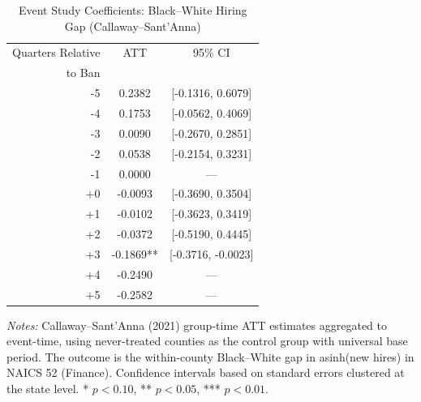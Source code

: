 \begin{table}[htbp]
\centering
\caption{Event Study Coefficients: Black--White Hiring Gap (Callaway--Sant'Anna)}
\label{tab:event_study}
\begin{tabular}{rcc}
\toprule
Quarters Relative & ATT & 95\% CI \\
to Ban & & \\
\midrule
-5 & 0.2382 & [-0.1316, 0.6079] \\
-4 & 0.1753 & [-0.0562, 0.4069] \\
-3 & 0.0090 & [-0.2670, 0.2851] \\
-2 & 0.0538 & [-0.2154, 0.3231] \\
-1 & 0.0000 & --- \\
+0 & -0.0093 & [-0.3690, 0.3504] \\
+1 & -0.0102 & [-0.3623, 0.3419] \\
+2 & -0.0372 & [-0.5190, 0.4445] \\
+3 & -0.1869** & [-0.3716, -0.0023] \\
+4 & -0.2490 & --- \\
+5 & -0.2582 & --- \\
\bottomrule
\end{tabular}
\begin{tablenotes}
\small
\item \textit{Notes:} Callaway--Sant'Anna (2021) group-time ATT estimates aggregated to event-time, using never-treated counties as the control group with universal base period. The outcome is the within-county Black--White gap in asinh(new hires) in NAICS 52 (Finance). Confidence intervals based on standard errors clustered at the state level. * $p<0.10$, ** $p<0.05$, *** $p<0.01$.
\end{tablenotes}
\end{table}

